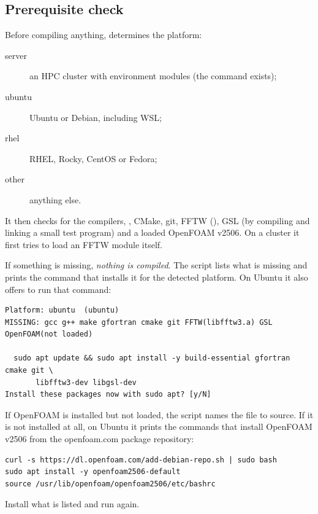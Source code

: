 \subsection{Prerequisite check}
Before compiling anything,  determines the platform:
\begin{description}
  \item[server] an HPC cluster with environment modules (the  command exists);
  \item[ubuntu] Ubuntu or Debian, including WSL;
  \item[rhel] RHEL, Rocky, CentOS or Fedora;
  \item[other] anything else.
\end{description}
It then checks for the compilers, , CMake, git, FFTW (), GSL (by
compiling and linking a small test program) and a loaded OpenFOAM v2506. On a cluster it
first tries to load an FFTW module itself.

If something is missing, \emph{nothing is compiled}. The script lists what is missing and
prints the command that installs it for the detected platform. On Ubuntu it also offers to run
that command:
\begin{lstlisting}[style=shell,caption={Typical output on a fresh Ubuntu installation.}]
Platform: ubuntu  (ubuntu)
MISSING: gcc g++ make gfortran cmake git FFTW(libfftw3.a) GSL OpenFOAM(not loaded)

  sudo apt update && sudo apt install -y build-essential gfortran cmake git \
       libfftw3-dev libgsl-dev
Install these packages now with sudo apt? [y/N]
\end{lstlisting}
If OpenFOAM is installed but not loaded, the script names the  file to
source. If it is not installed at all, on Ubuntu it prints the commands that install
OpenFOAM v2506 from the openfoam.com package repository:
\begin{lstlisting}[style=shell,caption={Installing OpenFOAM v2506 on Ubuntu or WSL.}]
curl -s https://dl.openfoam.com/add-debian-repo.sh | sudo bash
sudo apt install -y openfoam2506-default
source /usr/lib/openfoam/openfoam2506/etc/bashrc
\end{lstlisting}
Install what is listed and run  again.

